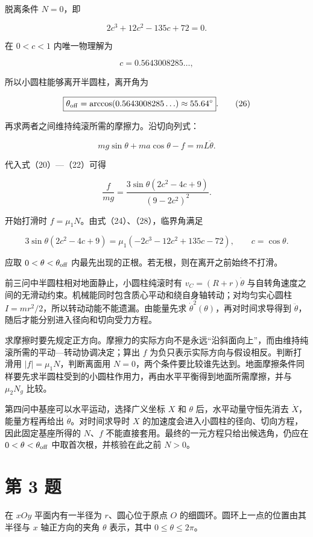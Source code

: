 \documentclass[12pt,a4paper,UTF8]{ctexart}
\begin{document}
脱离条件 \(N=0\)，即

\[2c^3+12c^2-135c+72=0. \tag{25}\]

在 \(0<c<1\) 内唯一物理解为

\[c=0.5643008285\ldots,\]

所以小圆柱能够离开半圆柱，离开角为

\[\boxed{\theta_{\rm off}=\arccos(0.5643008285\ldots)
\approx55.64^\circ}. \tag{26}\]

再求两者之间维持纯滚所需的摩擦力。沿切向列式：

\[mg\sin\theta+ma\cos\theta-f=mL\ddot\theta. \tag{27}\]

代入式（20）---（22）可得

\[\frac{f}{mg}
=\frac{3\sin\theta(2c^2-4c+9)}{(9-2c^2)^2}. \tag{28}\]

开始打滑时 \(f=\mu_1N\)。由式（24）、（28），临界角满足

\[\boxed{
3\sin\theta(2c^2-4c+9)
=\mu_1(-2c^3-12c^2+135c-72),
\qquad c=\cos\theta
}. \tag{29}\]

应取 \(0<\theta<\theta_{\rm off}\)
内最先出现的正根。若无根，则在离开之前始终不打滑。

前三问中半圆柱相对地面静止，小圆柱纯滚时有 \(v_C=(R+r)\dot\theta\)
与自转角速度之间的无滑动约束。机械能同时包含质心平动和绕自身轴转动；对均匀实心圆柱
\(I=mr^2/2\)，所以转动动能不能遗漏。由能量先求
\(\dot\theta^2(\theta)\)，再对时间求导得到
\(\ddot\theta\)，随后才能分别进入径向和切向受力方程。

求摩擦时要先规定正方向。摩擦力的实际方向不是永远``沿斜面向上''，而由维持纯滚所需的平动---转动协调决定；算出
\(f\) 为负只表示实际方向与假设相反。判断打滑用
\(|f|=\mu_1N\)，判断离面用
\(N=0\)，两个条件要比较谁先达到。地面摩擦条件同样要先求半圆柱受到的小圆柱作用力，再由水平平衡得到地面所需摩擦，并与
\(\mu_2N_g\) 比较。

第四问中基座可以水平运动，选择广义坐标 \(X\) 和 \(\theta\)
后，水平动量守恒先消去 \(\dot X\)，能量方程再给出
\(\dot\theta\)。对时间求导时 \(X\)
的加速度会进入小圆柱的径向、切向方程，因此固定基座所得的 \(N\)、\(f\)
不能直接套用。最终的一元方程只给出候选角，仍应在
\(0<\theta<\theta_{\rm off}\) 中取首次根，并核验在此之前 \(N>0\)。

\newpage

\section{第 3 题}\label{ux7b2c-3-ux9898}

在 \(xOy\) 平面内有一半径为 \(r\)、圆心位于原点 \(O\)
的细圆环。圆环上一点的位置由其半径与 \(x\) 轴正方向的夹角 \(\theta\)
表示，其中 \(0\leq\theta\leq2\pi\)。
\end{document}
